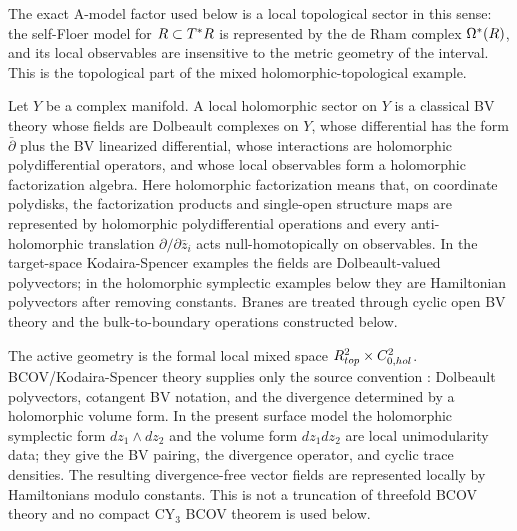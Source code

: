 \documentclass[11pt]{memoir}
\begin{document}
\begin{rmk}
  The exact A-model factor used below is a local topological sector in this
  sense: the self-Floer model for $R\subset T^*R$ is represented by the
  de Rham complex $\Omega^*(R)$, and its local observables are insensitive
  to the metric geometry of the interval. This is the topological part of
  the mixed holomorphic-topological example.
\end{rmk}

\begin{defn}\label{def:local-holomorphic-string-sector}
  Let $Y$ be a complex manifold. A local holomorphic sector on $Y$ is a
  classical BV theory whose fields are Dolbeault complexes on $Y$, whose
  differential has the form $\bar\partial$ plus the BV linearized
  differential, whose interactions are holomorphic polydifferential
  operators, and whose local observables form a holomorphic factorization
  algebra. Here holomorphic factorization means that, on coordinate
  polydisks, the factorization products and single-open structure maps are
  represented by holomorphic polydifferential operations and every
  anti-holomorphic translation $\partial/\partial\bar z_i$ acts
  null-homotopically on observables. In the target-space Kodaira-Spencer
  examples the fields are Dolbeault-valued polyvectors; in the holomorphic
  symplectic examples below they are Hamiltonian polyvectors after removing
  constants. Branes are treated through cyclic open BV theory and the
  bulk-to-boundary operations constructed below.
\end{defn}

\begin{rmk}
  The active geometry is the formal local mixed space
  \(R^2_{top}\times C^2_{0,hol}\).
  BCOV/Kodaira-Spencer theory supplies only the source convention
  \cite{bcov}: Dolbeault polyvectors, cotangent BV notation, and the
  divergence determined by a holomorphic volume form.  In the present
  surface model the holomorphic symplectic form
  \(dz_1\wedge dz_2\) and the volume form \(dz_1dz_2\) are local
  unimodularity data; they give the BV pairing, the divergence operator,
  and cyclic trace densities.  The resulting divergence-free vector
  fields are represented locally by Hamiltonians modulo constants.  This
  is not a truncation of threefold BCOV theory and no compact CY$_3$ BCOV
  theorem is used below.
\end{rmk}
\end{document}
